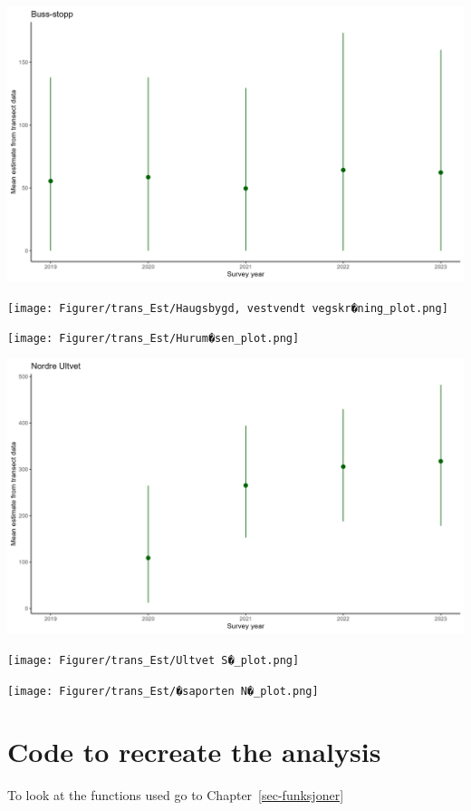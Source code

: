 \documentclass[
  letterpaper,
  DIV=11,
  numbers=noendperiod]{scrreport}
\begin{document}
\includegraphics{Figurer/trans_Est/Buss-stopp_plot.png}

\texttt{[image: Figurer/trans\_Est/Haugsbygd, vestvendt vegskr�ning\_plot.png]}

\texttt{[image: Figurer/trans\_Est/Hurum�sen\_plot.png]}

\includegraphics{Figurer/trans_Est/Nordre Ultvet_plot.png}

\texttt{[image: Figurer/trans\_Est/Ultvet S�\_plot.png]}

\texttt{[image: Figurer/trans\_Est/�saporten N�\_plot.png]}


\hypertarget{sec-code}{%
\chapter{Code to recreate the analysis}\label{sec-code}}

To look at the functions used go to Chapter~\ref{sec-funksjoner}
\end{document}
